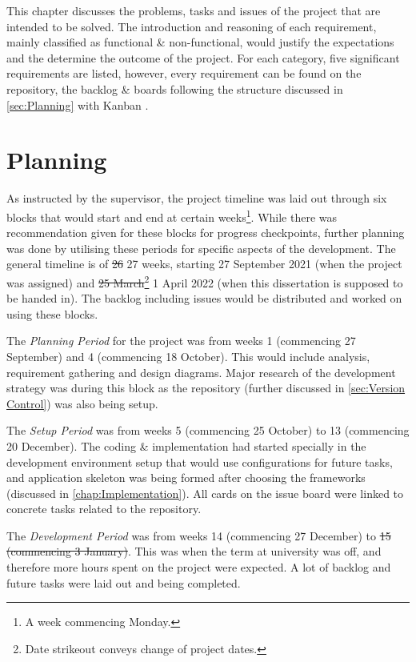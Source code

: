 \documentclass[../main.tex]{subfiles}
\begin{document}
This chapter discusses the problems, tasks and issues of the project that are intended to be solved. The introduction and reasoning of each requirement, mainly classified as functional \& non-functional, would justify the expectations and the determine the outcome of the project. For each category, five significant requirements are listed, however, every requirement can be found on the repository, the backlog \& boards following the structure discussed in \ref{sec:Planning} with Kanban \cite{anderson2015essential}.

\section{Planning}

As instructed by the supervisor, the project timeline was laid out through six blocks that would start and end at certain weeks\footnote{A week commencing Monday.}. While there was recommendation given for these blocks for progress checkpoints, further planning was done by utilising these periods for specific aspects of the development. The general timeline is of \sout{26} 27 weeks, starting 27 September 2021 (when the project was assigned) and \sout{25 March}\footnote{Date strikeout conveys change of project dates.} 1 April 2022 (when this dissertation is supposed to be handed in). The backlog including issues would be distributed and worked on using these blocks.


The \textit{Planning Period} for the project was from weeks 1 (commencing 27 September) and 4 (commencing 18 October). This would include analysis, requirement gathering and design diagrams. Major research of the development strategy was during this block as the repository (further discussed in \ref{sec:Version Control}) was also being setup.


The \textit{Setup Period} was from weeks 5 (commencing 25 October) to 13 (commencing 20 December). The coding \& implementation had started specially in the development environment setup that would use configurations for future tasks, and application skeleton was being formed after choosing the frameworks (discussed in \ref{chap:Implementation}). All cards on the issue board were linked to concrete tasks related to the repository.


The \textit{Development Period} was from weeks 14 (commencing 27 December) to \sout{15 (commencing 3 January)}. This was when the term at university was off, and therefore more hours spent on the project were expected. A lot of backlog and future tasks were laid out and being completed.
\end{document}

